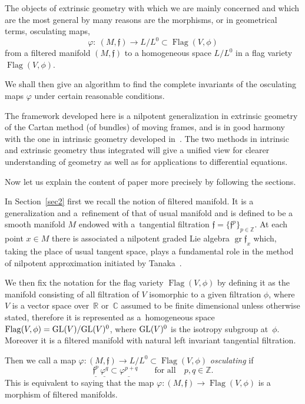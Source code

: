 \documentclass[pdftex]{sigma}%
\newcommand{\Z}{\mathbb Z}
\newcommand{\f}{\mathfrak f}
\newcommand{\Flag}{\operatorname{Flag}}
\newcommand{\gr}{\operatorname{gr}}
\numberwithin{equation}{section}
\begin{document}
The objects of extrinsic geometry with which we are mainly concerned and which are the most general by many reasons are the morphisms, or in geometrical terms, osculating maps,
\[
\varphi\colon\ (M, \mathfrak f) \to L/L^0 \subset \Flag(V, \phi)
\]
from a filtered manifold $(M, \mathfrak f)$ to a homogeneous space $L/L^0$ in a flag variety $\Flag(V, \phi)$.

We shall then give an algorithm to find the complete invariants of the osculating maps $\varphi$ under certain reasonable conditions.

The framework developed here is a nilpotent generalization in extrinsic geometry of the Cartan method (of bundles) of moving frames, and is in good harmony with the one in intrinsic geometry developed in~\cite{Mor1993,tan70,tan79}. The two methods in intrinsic and extrinsic geometry thus integrated will give a unified view for clearer understanding of geometry as well as for applications to differential equations.

Now let us explain the content of paper more precisely by following the
sections.

In Section~\ref{sec2} first we recall the notion of filtered manifold.
It is a generalization and a~refi\-nement of that of usual manifold and is defined to be a smooth manifold $M$ endowed with a~tangential filtration $\f = \{\f^p\}_{p \in \Z}$. At each point $x \in M $ there is associated a nilpotent graded Lie algebra $\gr\f_x$
which, taking the place of usual tangent space, plays a fundamental role in the method of nilpotent approximation initiated by Tanaka~\cite{tan70,tan79}.

We then fix the notation for the flag variety $\Flag(V, \phi)$ by defining it as the manifold consisting of all filtration of $V$ isomorphic to a given filtration $\phi$, where $V$ is a vector space over~$\mathbb R$ or~$\mathbb C$ assumed to be finite dimensional unless otherwise stated,
therefore it is represented as a~homogeneous space $\Flag(V, \phi )= {\rm GL}(V)/{\rm GL}(V)^0$, where ${\rm GL}(V)^0$ is the isotropy subgroup at~$\phi$.
Moreover it is a filtered manifold with natural left invariant tangential filtration.


Then we call a map $\varphi \colon (M, \mathfrak f ) \to L/L^0 \subset \Flag(V, \phi)$ \emph{osculating} if
\[
\underline{\f^p }\,\underline{\varphi^q }
\subset \underline{\varphi^{p+q} }\qquad \text {for all}\quad p, q \in \mathbb Z.
\]
This is equivalent to saying that the map $\varphi\colon(M, \mathfrak f ) \to \Flag(V, \phi)$ is a morphism of filtered manifolds.
\end{document}
